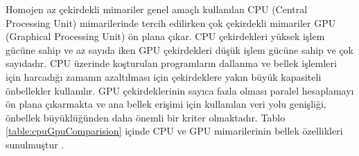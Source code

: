 
Homojen az çekirdekli mimariler genel amaçlı kullanılan CPU (Central Processing Unit) mimarilerinde tercih edilirken çok çekirdekli mimariler GPU (Graphical Processing Unit) ön plana çıkar. CPU çekirdekleri yüksek işlem gücüne sahip ve az sayıda iken GPU çekirdekleri düşük işlem gücüne sahip ve çok sayıdadır. CPU üzerinde koşturulan programların dallanma ve bellek işlemleri için harcadığı zamanın azaltılması için çekirdeklere yakın büyük kapasiteli önbellekler kullanılır. GPU çekirdeklerinin sayıca fazla olması paralel hesaplamayı ön plana çıkarmakta ve ana bellek erişimi için kullanılan veri yolu genişliği, önbellek büyüklüğünden daha önemli bir kriter olmaktadır. Tablo \ref{table:cpuGpuComparision} içinde CPU ve GPU mimarilerinin bellek özellikleri sunulmuştur \cite{cpuGpuMemoryTable}. \par





